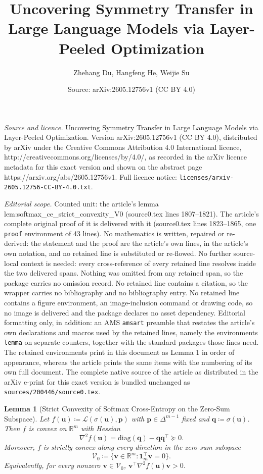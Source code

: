 \documentclass[10pt,a4paper]{amsart}
\title{Uncovering Symmetry Transfer in Large Language Models via Layer-Peeled Optimization}
\author{Zhehang Du, Hangfeng He, Weijie Su}
\date{Source: arXiv:2605.12756v1 (CC BY 4.0)}
\newtheorem{lemma}{Lemma}
\begin{document}
\maketitle

\noindent\emph{Source and licence.} Uncovering Symmetry Transfer in Large Language Models via Layer-Peeled Optimization. Version arXiv:2605.12756v1 (CC BY 4.0), distributed by arXiv under the Creative Commons Attribution 4.0 International licence, http://creativecommons.org/licenses/by/4.0/, as recorded in the arXiv licence metadata for this exact version and shown on the abstract page https://arxiv.org/abs/2605.12756v1. Full licence notice: \texttt{licenses/arxiv-2605.12756-CC-BY-4.0.txt}.\par\smallskip

\noindent\textit{Editorial scope.} Counted unit: the article's lemma lem:softmax\_ce\_strict\_convexity\_V0 (source0.tex lines 1807--1821). The article's complete original proof of it is delivered with it (source0.tex lines 1823--1865, one \texttt{proof} environment of 43 lines). No mathematics is written, repaired or re-derived: the statement and the proof are the article's own lines, in the article's own notation, and no retained line is substituted or re-flowed.  No further source-local context is needed: every cross-reference of every retained line resolves inside the two delivered spans.  Nothing was omitted from any retained span, so the package carries no omission record.  No retained line contains a citation, so the wrapper carries no bibliography and no bibliography entry.  No retained line contains a figure environment, an image-inclusion command or drawing code, so no image is delivered and the package declares no asset dependency.  Editorial formatting only, in addition: an AMS \texttt{amsart} preamble that restates the article's own declarations and macros used by the retained lines, namely the environments \texttt{lemma} on separate counters, together with the standard packages those lines need.  The retained environments print in this document as Lemma 1 in order of appearance, whereas the article prints the same items with the numbering of its own full document.  The complete native source of the article as distributed in the arXiv e-print for this exact version is bundled unchanged as \texttt{sources/200446/source0.tex}.
\begin{lemma}[Strict Convexity of Softmax Cross-Entropy on the Zero-Sum Subspace]
\label{lem:softmax_ce_strict_convexity_V0}
Let \(f(\boldsymbol u) \coloneqq \mathcal L(\sigma(\boldsymbol u), \boldsymbol p)\)
with \(\boldsymbol p\in\Delta^{m-1}\) fixed and \(\boldsymbol q \coloneqq \sigma(\boldsymbol u)\).
Then \(f\) is convex on \(\mathbb R^m\) with Hessian
\[
\nabla^2 f(\boldsymbol u)   =   \mathrm{diag}(\boldsymbol q) - \boldsymbol q \boldsymbol q^\top \succeq 0.
\]
Moreover, \(f\) is strictly convex along every direction in the zero-sum subspace
\[
\mathcal V_0 \coloneqq \{\boldsymbol v\in\mathbb R^m : \boldsymbol{1}_m^\top \boldsymbol v = 0 \}.
\]
Equivalently, for every nonzero \(\boldsymbol v\in \mathcal V_0\),
\(\boldsymbol v^\top \nabla^2 f(\boldsymbol u)   \boldsymbol v > 0\).
\end{lemma}
\end{document}
